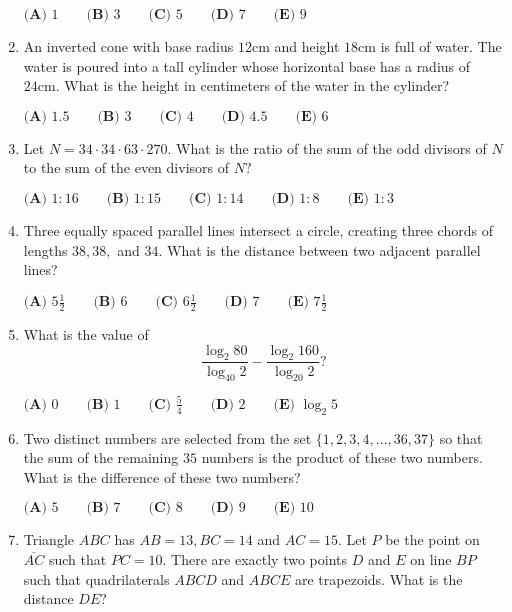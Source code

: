 \documentclass{article}
\begin{document}
\begin{enumerate}[label=\arabic*., itemsep=0.5em]
\(\textbf{(A) }1 \qquad \textbf{(B) }3 \qquad \textbf{(C) }5 \qquad \textbf{(D) }7 \qquad \textbf{(E) }9\)\par \vspace{0.5em}\item An inverted cone with base radius \(12 \text{cm}\) and height \(18\text{cm}\) is full of water. The water is poured into a tall cylinder whose horizontal base has a radius of \(24\text{cm}\). What is the height in centimeters of the water in the cylinder?

\(\textbf{(A) }1.5 \qquad \textbf{(B) }3 \qquad \textbf{(C) }4 \qquad \textbf{(D) }4.5 \qquad \textbf{(E) }6\)\par \vspace{0.5em}\item Let \(N=34\cdot34\cdot63\cdot270.\) What is the ratio of the sum of the odd divisors of \(N\) to the sum of the even divisors of \(N?\)

\(\textbf{(A) }1:16 \qquad \textbf{(B) }1:15 \qquad \textbf{(C) }1:14 \qquad \textbf{(D) }1:8 \qquad \textbf{(E) }1:3\)\par \vspace{0.5em}\item Three equally spaced parallel lines intersect a circle, creating three chords of lengths \(38,38,\) and \(34\). What is the distance between two adjacent parallel lines?

\(\textbf{(A) }5\frac12 \qquad \textbf{(B) }6 \qquad \textbf{(C) }6\frac12 \qquad \textbf{(D) }7 \qquad \textbf{(E) }7\frac12\)\par \vspace{0.5em}\item What is the value of
\begin{equation*}
\frac{\log_2 80}{\log_{40}2}-\frac{\log_2 160}{\log_{20}2}?
\end{equation*}

\(\textbf{(A) }0 \qquad \textbf{(B) }1 \qquad \textbf{(C) }\frac54 \qquad \textbf{(D) }2 \qquad \textbf{(E) }\log_2 5\)\par \vspace{0.5em}\item Two distinct numbers are selected from the set \(\{1,2,3,4,\dots,36,37\}\) so that the sum of the remaining \(35\) numbers is the product of these two numbers. What is the difference of these two numbers?

\(\textbf{(A) }5 \qquad \textbf{(B) }7 \qquad \textbf{(C) }8\qquad \textbf{(D) }9 \qquad \textbf{(E) }10\)\par \vspace{0.5em}\item Triangle \(ABC\) has \(AB=13,BC=14\) and \(AC=15\). Let \(P\) be the point on \(\overline{AC}\) such that \(PC=10\). There are exactly two points \(D\) and \(E\) on line \(BP\) such that quadrilaterals \(ABCD\) and \(ABCE\) are trapezoids. What is the distance \(DE?\)


\end{enumerate}
\end{document}
